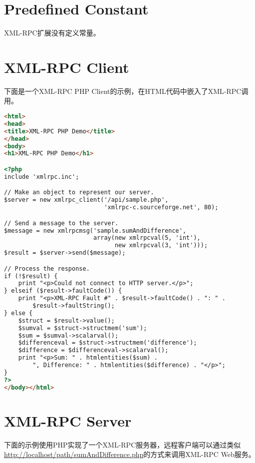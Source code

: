 \section{Predefined Constant}

XML-RPC扩展没有定义常量。

\section{XML-RPC Client}


下面是一个XML-RPC PHP Client的示例，在HTML代码中嵌入了XML-RPC调用。

\begin{lstlisting}[language=HTML]
<html>
<head>
<title>XML-RPC PHP Demo</title>
</head>
<body>
<h1>XML-RPC PHP Demo</h1>

<?php
include 'xmlrpc.inc';

// Make an object to represent our server.
$server = new xmlrpc_client('/api/sample.php',
                            'xmlrpc-c.sourceforge.net', 80);

// Send a message to the server.
$message = new xmlrpcmsg('sample.sumAndDifference',
                         array(new xmlrpcval(5, 'int'),
                               new xmlrpcval(3, 'int')));
$result = $server->send($message);

// Process the response.
if (!$result) {
    print "<p>Could not connect to HTTP server.</p>";
} elseif ($result->faultCode()) {
    print "<p>XML-RPC Fault #" . $result->faultCode() . ": " .
        $result->faultString();
} else {
    $struct = $result->value();
    $sumval = $struct->structmem('sum');
    $sum = $sumval->scalarval();
    $differenceval = $struct->structmem('difference');
    $difference = $differenceval->scalarval();
    print "<p>Sum: " . htmlentities($sum) .
        ", Difference: " . htmlentities($difference) . "</p>";
}
?>
</body></html>
\end{lstlisting}

\section{XML-RPC Server}

下面的示例使用PHP实现了一个XML-RPC服务器，远程客户端可以通过类似\url{http://localhost/path/sumAndDifference.php}的方式来调用XML-RPC Web服务。


